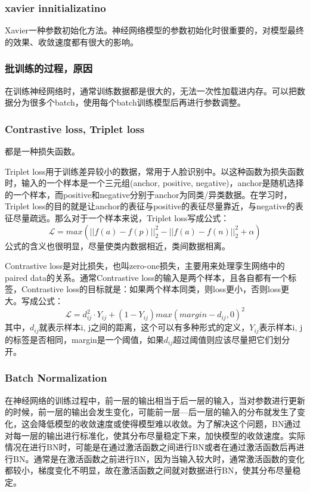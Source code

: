 \subsubsection{xavier innitializatino} 
Xavier\cite{pmlr-v9-glorot10a}一种参数初始化方法。神经网络模型的参数初始化时很重要的，对模型最终的效果、收敛速度都有很大的影响。

\subsubsection{批训练的过程，原因}
在训练神经网络时，通常训练数据都是很大的，无法一次性加载进内存。可以把数据分为很多个batch，使用每个batch训练模型后再进行参数调整。

\subsubsection{Contrastive loss, Triplet loss} 
都是一种损失函数。

Triplet loss用于训练差异较小的数据，常用于人脸识别中。以这种函数为损失函数时，输入的一个样本是一个三元组(anchor, positive, negative)，anchor是随机选择的一个样本，而positive和negative分别于anchor为同类/异类数据。在学习时，Triplet loss的目的就是让anchor的表征与positive的表征尽量靠近，与negative的表征尽量疏远。那么对于一个样本来说，Triplet loss写成公式： $$\mathcal{L} = max( ||f(a)-f(p)||_2^2 - ||f(a) - f(n)||_2^2 + \alpha )
$$
公式的含义也很明显，尽量使类内数据相近，类间数据相离。

Contrastive loss是对比损失，也叫zero-one损失，主要用来处理孪生网络中的paired data的关系。通常Contrastive loss的输入是两个样本，且各自都有一个标签，Contrastive loss的目标就是：如果两个样本同类，则loss更小，否则loss更大。写成公式：
$$
\mathcal{L} = d_{ij}^2 \cdot Y_{ij} + (1 - Y_{ij} )max(margin - d_{ij}, 0)^2
$$
其中，$d_{ij}$就表示样本i, j之间的距离，这个可以有多种形式的定义，$Y_{ij}$表示样本i, j的标签是否相同，margin是一个阈值，如果$d_{ij}$超过阈值则应该尽量把它们划分开。

\subsubsection{Batch Normalization}
在神经网络的训练过程中，前一层的输出相当于后一层的输入，当对参数进行更新的时候，前一层的输出会发生变化，可能前一层---后一层的输入的分布就发生了变化，这会降低模型的收敛速度或使得模型难以收敛。为了解决这个问题，BN通过对每一层的输出进行标准化，使其分布尽量稳定下来，加快模型的收敛速度。实际情况在进行BN时，可能是在通过激活函数之间进行BN或者在通过激活函数后再进行BN。通常是在激活函数之前进行BN，因为当输入较大时，通常激活函数的变化都较小，梯度变化不明显，故在激活函数之间就对数据进行BN，使其分布尽量稳定。


